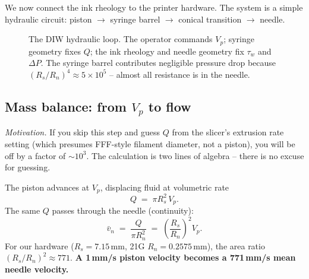 \documentclass[11pt,a4paper]{article}
\begin{document}
We now connect the ink rheology to the printer hardware. The system is a
simple hydraulic circuit: piston $\to$ syringe barrel $\to$ conical
transition $\to$ needle.

\begin{figure}[h]
\centering
{}
\caption{The DIW hydraulic loop. The operator commands $V_p$; syringe
geometry fixes $Q$; the ink rheology and needle geometry fix $\tau_w$
and $\Delta P$. The syringe barrel contributes negligible pressure drop
because $(R_s/R_n)^4\approx 5\times 10^5$ -- almost all resistance is
in the needle.}
\label{fig:loop}
\end{figure}

\subsection{Mass balance: from $V_p$ to flow}
\label{sec:mass_balance_Q}

\emph{Motivation.}
If you skip this step and guess $Q$ from the slicer's extrusion rate
setting (which presumes FFF-style filament diameter, not a piston), you
will be off by a factor of $\sim 10^3$. The calculation is two lines of
algebra -- there is no excuse for guessing.

The piston advances at $V_p$, displacing fluid at volumetric rate
\begin{equation}
Q \;=\; \pi R_s^2 \, V_p.
\label{eq:Q_from_Vp}
\end{equation}
The same $Q$ passes through the needle (continuity):
\begin{equation}
\bar v_n \;=\; \frac{Q}{\pi R_n^2}
           \;=\; \left(\frac{R_s}{R_n}\right)^2 V_p.
\label{eq:vbar_n}
\end{equation}
For our hardware ($R_s=7.15$\,mm, 21G $R_n=0.2575$\,mm), the area ratio
$(R_s/R_n)^2\approx 771$. \textbf{A 1\,\si{\mm/\s} piston velocity
becomes a 771\,\si{\mm/\s} mean needle velocity.}
\end{document}

